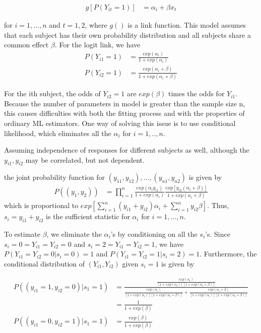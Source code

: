 \documentclass[11pt]{article} %
\begin{document}
	\begin{align*}
	g[P(Y_{it}=1)] &= \alpha_i + \beta x_t
	\end{align*}	
	
	for $i = 1, ..., n$ and $t = 1, 2$, where $g()$ is a link function. This model assumes that each subject has their own probability distribution and all subjects share a common effect $\beta$. For the logit link, we have
	\begin{align*}
		P(Y_{i1}=1) &= \frac{exp(\alpha_i)}{1 + exp(\alpha_i)}\\
		P(Y_{i2}=1) &= \frac{exp(\alpha_i + \beta )}{1 + exp(\alpha_i + \beta)}
	\end{align*}

	For the ith subject, the odds of $Y_{i2} = 1$ are $exp(\beta)$ times the odds for $Y_{i1}$. Because the number of parameters in model is greater than the sample size n, this causes difficulties with both the fitting process and with the properties of ordinary ML estimators. One way of solving this issue is
	to use conditional likelihood, which eliminates all the $\alpha_i$ for $i = 1,.., n$.
	
	Assuming independence of responses for different subjects as well, although the $y_{i1}, y_{i2}$ may be correlated, but not dependent.
	
	the joint probability function for ${(y_{11}, y_{12}), ... , (y_{n1}, y_{n2})}$ is given by
	\begin{align*}
		P((y_{1}, y_{2})) &= \prod_{i=1}^n \frac{exp(\alpha_i y_{i1})}{1 + exp(\alpha_i)} \frac{exp[y_{i2}(\alpha_i + \beta )] }{1 + exp(\alpha_i + \beta)} 
	\end{align*}
	which is proportional to $exp[\sum_{i=1}^n (y_{i1} + y_{i2} )\alpha_i + \sum_{i=1}^n y_{i2} \beta]$. Thus, $s_i = y_{i1}+y_{i2}$ is the sufficient statistic for $\alpha_i$ for $i = 1, ... , n$.
	
	To estimate $\beta$, we eliminate the $\alpha_i$’s by conditioning on all the $s_i$’s. Since ${s_i = 0} = {Y_{i1} = Y_{i2} = 0}$ and ${s_i = 2} = {Y_{i1} = Y_{i2} = 1}$, we have $P(Y_{i1} = Y_{i2} = 0|s_i = 0) = 1$ and $P(Y_{i1} = Y_{i2}  = 1|s_i = 2) = 1$. Furthermore, the conditional distribution of $(Y_{i1} , Y_{i2})$  given	$s_i = 1$ is given by
	
	\begin{align*}
		P((y_{i1}=1, y_{i2}=0)| s_1 =1) &=  \frac{\frac{exp(\alpha_i)}{[1 + exp(\alpha_i)] [1 + exp(\alpha_i + \beta)]}}{\frac{exp(\alpha_i)}{[1 + exp(\alpha_i)] [1 + exp(\alpha_i + \beta)]} + \frac{exp(\alpha_i + \beta)}{[1 + exp(\alpha_i)] [1 + exp(\alpha_i + \beta)]}} \\
		&= \frac{1}{1 + exp(\beta)}\\
		P((y_{i1}=0, y_{i2}=1)| s_1 =1) &= \frac{exp(\beta)}{1 + exp(\beta)}
	\end{align*}
	
\end{document}
